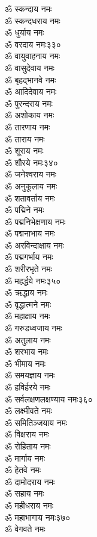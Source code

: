 \begin{center}
\begin{multicols}{2}
\begin{flushleft}
ॐ स्कन्दाय नमः\\
ॐ स्कन्दधराय नमः\\
ॐ धुर्याय नमः\\
ॐ वरदाय नमः\hfill ३३०\\
ॐ वायुवाहनाय नमः\\
ॐ वासुदेवाय नमः\\
ॐ बृहद्भानवे नमः\\
ॐ आदिदेवाय नमः\\
ॐ पुरन्दराय नमः\\
ॐ अशोकाय नमः\\
ॐ तारणाय नमः\\
ॐ ताराय नमः\\
ॐ शूराय नमः\\
ॐ शौरये नमः\hfill ३४०\\
ॐ जनेश्वराय नमः\\
ॐ अनुकूलाय नमः\\
ॐ शतावर्ताय नमः\\
ॐ पद्मिने नमः\\
ॐ पद्मनिभेक्षणाय नमः\\
ॐ पद्मनाभाय नमः\\
ॐ अरविन्दाक्षाय नमः\\
ॐ पद्मगर्भाय नमः\\
ॐ शरीरभृते नमः\\
ॐ महर्द्धये नमः\hfill ३५०\\
ॐ ऋद्धाय नमः\\
ॐ वृद्धात्मने नमः\\
ॐ महाक्षाय नमः\\
ॐ गरुडध्वजाय नमः\\
ॐ अतुलाय नमः\\
ॐ शरभाय नमः\\
ॐ भीमाय नमः\\
ॐ समयज्ञाय नमः\\
ॐ हविर्हरये नमः\\
ॐ सर्वलक्षणलक्षण्याय नमः\hfill ३६०\\
ॐ लक्ष्मीवते नमः\\
ॐ समितिञ्जयाय नमः\\
ॐ विक्षराय नमः\\
ॐ रोहिताय नमः\\
ॐ मार्गाय नमः\\
ॐ हेतवे नमः\\
ॐ दामोदराय नमः\\
ॐ सहाय नमः\\
ॐ महीधराय नमः\\
ॐ महाभागाय नमः\hfill ३७०\\
ॐ वेगवते नमः\\

\end{flushleft}
\end{multicols}
\end{center}
